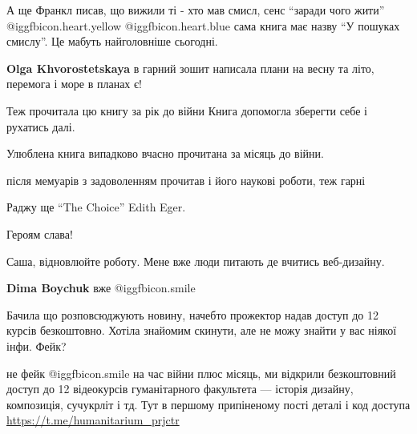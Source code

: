  
 
 
 
 
\zzSecCmt

\begin{itemize} %

А ще Франкл писав, що вижили ті - хто мав смисл, сенс \enquote{заради чого
жити}  @igg{fbicon.heart.yellow}  @igg{fbicon.heart.blue}  сама книга має назву \enquote{У пошуках смислу}. Це мабуть
найголовніше сьогодні.

\textbf{Olga Khvorostetskaya} в гарний зошит написала плани на весну та літо, перемога і море в планах є!


Теж прочитала цю книгу за рік до війни Книга допомогла зберегти себе і рухатись
далі.

Улюблена книга випадково вчасно прочитана за місяць до війни.

\begin{itemize} %

після мемуарів з задоволенням прочитав і його наукові роботи, теж гарні

Раджу ще \enquote{The Choice} Edith Eger.
\end{itemize} %


Героям слава!

Саша, відновлюйте роботу. Мене вже люди питають де вчитись веб-дизайну.

\textbf{Dima Boychuk} вже  @igg{fbicon.smile} 


Бачила що розповсюджують новину, начебто прожектор надав доступ до 12 курсів
безкоштовно. Хотіла знайомим скинути, але не можу знайти у вас ніякої інфи.
Фейк?

\begin{itemize} %

не фейк  @igg{fbicon.smile}  на час війни плюс місяць, ми відкрили безкоштовний доступ до 12
відеокурсів гуманітарного факультета — історія дизайну, композиція, сучукрліт і
тд. Тут в першому припіненому пості деталі і код доступа
\url{https://t.me/humanitarium_prjctr}


\end{itemize}
\end{itemize}
